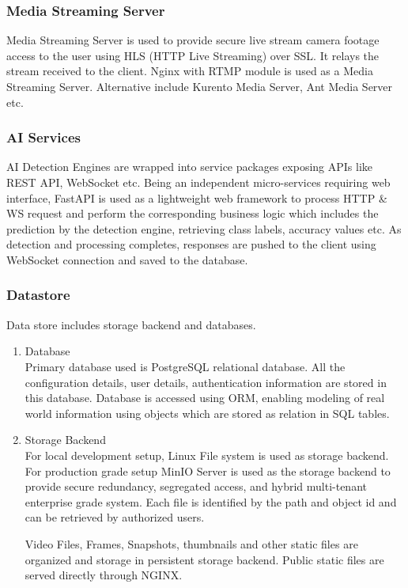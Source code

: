 \subsubsection{Media Streaming Server}
Media Streaming Server is used to provide secure live stream camera footage access to the user using HLS (HTTP Live Streaming) over SSL. It relays the stream received to the client. Nginx with RTMP module is used as a Media Streaming Server. Alternative include Kurento Media Server, Ant Media Server etc.

\subsubsection{AI Services}
AI Detection Engines are wrapped into service packages exposing APIs like REST API, WebSocket etc. Being an independent micro-services requiring web interface, FastAPI is used as a lightweight web framework to process HTTP \& WS request and perform the corresponding business logic which includes the prediction by the detection engine, retrieving class labels, accuracy values etc. As detection and processing completes, responses are pushed to the client using WebSocket connection and saved to the database.

\subsubsection{Datastore}
Data store includes storage backend and databases. 
	\begin{enumerate}
		\item Database \\
		Primary database used is PostgreSQL relational database. All the configuration details, user details, authentication information are stored in this database. Database is accessed using ORM, enabling modeling of real world information using objects which are stored as relation in SQL tables.
		
		\item Storage Backend \\
		For local development setup, Linux File system is used as storage backend. For production grade setup MinIO Server is used as the storage backend to provide secure redundancy, segregated access, and hybrid multi-tenant enterprise grade system. Each file is identified by the path and object id and can be retrieved by authorized users.
		
		Video Files, Frames, Snapshots, thumbnails and other static files are organized and storage in persistent storage backend. Public static files are served directly through NGINX.
	\end{enumerate}

